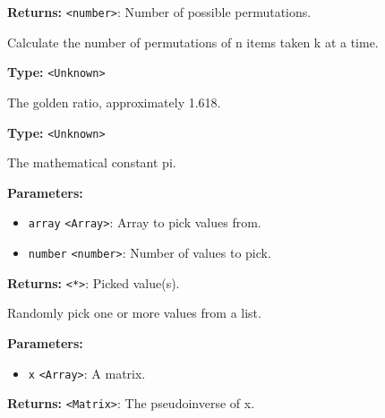 \documentclass[12pt,a4paper]{article}
\begin{document}
\noindent \textbf{Returns:} \texttt{<number>}: Number of possible permutations.

\noindent Calculate the number of permutations of n items taken k at a time.

\vspace{5mm}
\noindent {}\vspace{4mm}


\noindent \textbf{Type:} \texttt{<Unknown>}

\noindent The golden ratio, approximately 1.618.

\vspace{5mm}
\noindent {}\vspace{4mm}


\noindent \textbf{Type:} \texttt{<Unknown>}

\noindent The mathematical constant pi.

\vspace{5mm}
\noindent {}


\noindent \textbf{Parameters:}
\begin{itemize}
  \item \texttt{array} \texttt{<Array>}: Array to pick values from.
  \item \texttt{number} \texttt{<number>}: Number of values to pick.
\end{itemize}

\noindent \textbf{Returns:} \texttt{<*>}: Picked value(s).

\noindent Randomly pick one or more values from a list.

\vspace{5mm}
\noindent {}


\noindent \textbf{Parameters:}
\begin{itemize}
  \item \texttt{x} \texttt{<Array>}: A matrix.
\end{itemize}

\noindent \textbf{Returns:} \texttt{<Matrix>}: The pseudoinverse of x.
\end{document}
